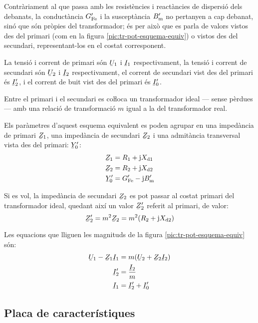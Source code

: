 Contràriament al que passa amb les resistències i reactàncies de dispersió dels debanats, la conductància $G_\mathrm{Fe}'$ i la susceptància $B_\mathrm{m}'$ no pertanyen a cap debanat, sinó que són pròpies del transformador; és per això que es parla de valors vistos des del primari (com en la figura \vref{pic:tr-pot-esquema-equiv}) o vistos des del secundari, representant-los en el costat corresponent.

La tensió i corrent de primari són $\cmplx{U}_1$ i $\cmplx{I}_1$ respectivament, la tensió i corrent de secundari són $\cmplx{U}_2$ i $\cmplx{I}_2$ respectivament, el corrent de secundari vist des del primari és $\cmplx{I}_2'$, i el corrent de buit vist des del primari és $\cmplx{I}_0'$.

Entre el primari i el secundari es coŀloca un transformador ideal --- sense pèrdues --- amb una relació de transformació $m$ igual a la del transformador real.

Els paràmetres d'aquest esquema equivalent es poden agrupar en una impedància de primari $\cmplx{Z}_1$, una impedància de secundari $\cmplx{Z}_2$ i una  admitància transversal vista des del primari: $\cmplx{Y}_0'$:
\begin{align}
    \cmplx{Z}_1 &= R_1 + \ju X\ped{d1} \\
    \cmplx{Z}_2 &= R_2 + \ju X\ped{d2}\\
    \cmplx{Y}_0' &= G\ped{Fe}'- \ju B\ped{m}'
\end{align}

Si es vol, la impedància de secundari $\cmplx{Z}_2$ es pot passar al costat primari del transformador ideal, quedant així un valor $\cmplx{Z}_2'$ referit al primari, de valor:
\begin{equation}
    \cmplx{Z}_2' = m^2 \cmplx{Z}_2 =  m^2 (R_2 + \ju X\ped{d2})
\end{equation}

Les equacions que lliguen les magnituds de la figura \vref{pic:tr-pot-esquema-equiv} són:
\begin{align}
    \cmplx{U}_1 - \cmplx{Z}_1 \cmplx{I}_1 &= m ( \cmplx{U}_2  + \cmplx{Z}_2 \cmplx{I}_2 ) \\
    \cmplx{I}_2' &=   \frac{\cmplx{I}_2}{m} \\
    \cmplx{I}_1  &=   \cmplx{I}_2' + \cmplx{I}_0'
\end{align}


\subsection{Placa de característiques}

